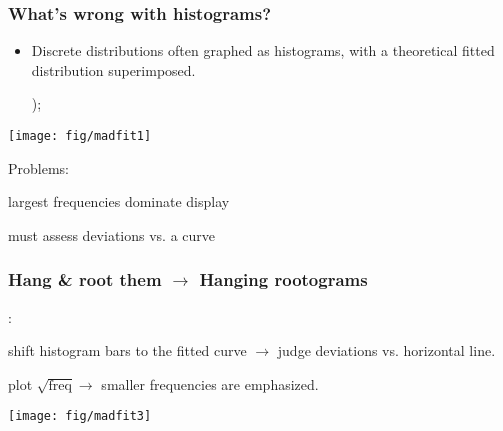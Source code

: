 \begin{frame}[fragile]

  \frametitle{What's wrong with histograms?}
  \begin{itemize}
  \item Discrete distributions often graphed as histograms, with a 
  theoretical fitted distribution superimposed.

  \begin{Code}
      );
  \end{Code}

  \end{itemize}

 \begin{minipage}[c]{.49\dispwidth}
  \texttt{[image: fig/madfit1]}
 \end{minipage}%
 \hfill
 \begin{minipage}[c]{.49\dispwidth}
 Problems:
	\begin{itemize*}
	\item largest frequencies dominate display
	\item must assess deviations vs. a curve
	\end{itemize*}
 \end{minipage}
	
\end{frame}

\begin{frame}[fragile]
  \frametitle{Hang \& root them $\rightarrow$ Hanging rootograms}
  \citet{Tukey:72,Tukey:77}:
  \begin{itemize*}
  \item shift histogram bars to 
  the fitted curve $\rightarrow$ judge deviations vs. horizontal line.
  \item plot $\sqrt{\mbox{freq}} \rightarrow$
  smaller frequencies are emphasized.
  \end{itemize*}

    \begin{center}
	\texttt{[image: fig/madfit3]}
    \end{center}

\end{frame}

